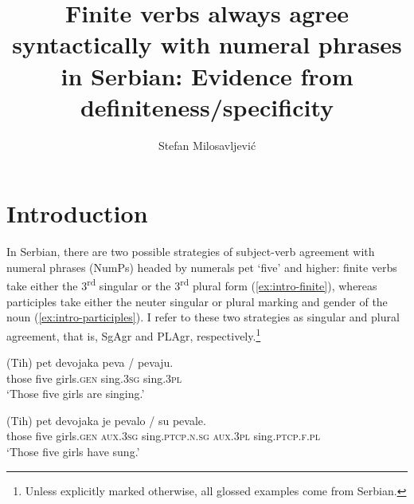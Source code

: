 \documentclass[output=paper,colorlinks,citecolor=brown
]{langscibook}
\author{Stefan Milosavljević\orcid{0000-0003-2305-2519}\affiliation{University of Graz}}
\title[Finite verbs agree syntactically with NumPs in Serbian]{Finite verbs always agree syntactically with numeral phrases in Serbian: Evidence from definiteness/specificity}
\begin{document}
\maketitle

%


\section{Introduction}
In Serbian, there are two possible strategies of subject-verb agreement with numeral phrases (NumPs) headed by numerals pet ‘five’ and higher: finite verbs take either the 3\textsuperscript{rd} singular or the 3\textsuperscript{rd} plural form (\ref{ex:intro-finite}), whereas participles take either the neuter singular or plural marking and gender of the noun (\ref{ex:intro-participles}). I refer to these two strategies as singular and plural agreement, that is, SgAgr and PLAgr, respectively.\footnote{Unless explicitly marked otherwise, all glossed examples come from Serbian.} 



\ea \label{ex:intro} \label{ex:intro-finite}
\gll (Tih) pet devojaka peva / pevaju.\\
those five girls.\textsc{gen} sing.\textsc{3sg} {} sing.\textsc{3pl}\\
\glt `Those five girls are singing.'
\z

\ea \label{ex:intro-participles}
\gll (Tih) pet devojaka je pevalo / su pevale.\\
those five girls.\textsc{gen} \textsc{aux.3sg} sing.\textsc{ptcp.n.sg} {} \textsc{aux.3pl} sing.\textsc{ptcp.f.pl}\\
\glt `Those five girls have sung.'
\z
\end{document}
